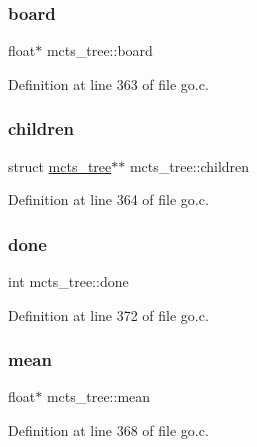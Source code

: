 \subsubsection{\texorpdfstring{board}{board}}
{\footnotesize\ttfamily float$\ast$ mcts\+\_\+tree\+::board}



Definition at line 363 of file go.\+c.

\mbox{\label{structmcts__tree_ac3116e318ed83f71180e428ba9f09ba5}} 
\subsubsection{\texorpdfstring{children}{children}}
{\footnotesize\ttfamily struct \mbox{\hyperlink{structmcts__tree}{mcts\+\_\+tree}}$\ast$$\ast$ mcts\+\_\+tree\+::children}



Definition at line 364 of file go.\+c.

\mbox{\label{structmcts__tree_adc0ebbeaa070a62f6530f1fe59c0a036}} 
\subsubsection{\texorpdfstring{done}{done}}
{\footnotesize\ttfamily int mcts\+\_\+tree\+::done}



Definition at line 372 of file go.\+c.

\mbox{\label{structmcts__tree_aaa243f2c96b587bd32b7376737289ba0}} 
\subsubsection{\texorpdfstring{mean}{mean}}
{\footnotesize\ttfamily float$\ast$ mcts\+\_\+tree\+::mean}



Definition at line 368 of file go.\+c.

\mbox{\label{structmcts__tree_a3dec5169d2eb9976e7734d01fa61047a}} 
